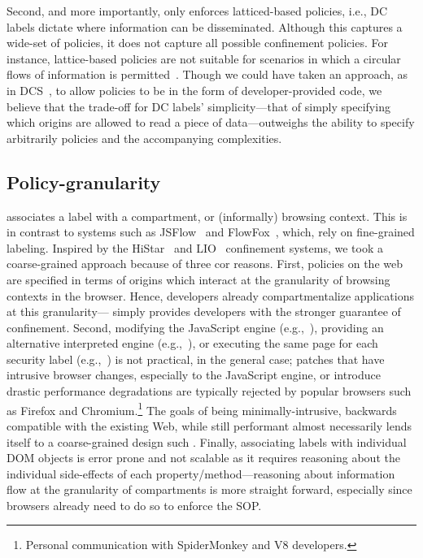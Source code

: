 Second, and more importantly, \sys{} only enforces latticed-based
policies, i.e., DC labels dictate where information can be
disseminated.
%
Although this captures a wide-set of policies, it does not capture all
possible confinement policies.
%
For instance, lattice-based policies are not suitable for scenarios in
which a circular flows of information is permitted~\cite{Badger:1995}.
%
Though we could have taken an approach, as in DCS~\cite{Akhawe2013},
to allow policies to be in the form of developer-provided code, we
believe that the trade-off for DC labels' simplicity---that of simply
specifying which origins are allowed to read a piece of
data---outweighs the ability to specify arbitrarily policies and the
accompanying complexities.


\subsection{Policy-granularity}
\label{sec:discussion:granularity}

\sys{} associates a label with a compartment, or (informally) browsing
context.
%
This is in contrast to systems such as JSFlow~\cite{Hedin:2012} and
FlowFox~\cite{DeGroef:2012}, which, rely on fine-grained labeling.
%
Inspired by the HiStar~\cite{Zeldovich:2006} and
LIO~\cite{stefan:2011:flexible} confinement systems, we took a coarse-grained
approach because of three cor reasons.
%
First, policies on the web are specified in terms of origins which
interact at the granularity of browsing contexts in the browser.
%
Hence, developers already compartmentalize applications at this
granularity---\sys{} simply provides developers with the stronger
guarantee of confinement.
%
Second, modifying the JavaScript engine
(e.g.,~), providing an alternative interpreted
engine (e.g.,~\cite{Hedin:2012}), or executing the same page for each
security label (e.g.,~\cite{DeGroef:2012}) is not practical, in the
general case; patches that have intrusive browser changes, especially
to the JavaScript engine, or introduce drastic performance
degradations are typically rejected by popular browsers such as
Firefox and Chromium.\footnote{
  Personal communication with SpiderMonkey and V8 developers.
}
%
The goals of being minimally-intrusive, backwards compatible with the
existing Web, while still performant almost necessarily lends itself
to a coarse-grained design such \sys{}.
%
Finally, associating labels with individual DOM objects is error
prone and not scalable as it requires reasoning about the individual
side-effects of each property/method---reasoning about information
flow at the granularity of compartments is more straight forward,
especially since browsers already need to do so to enforce the SOP.

